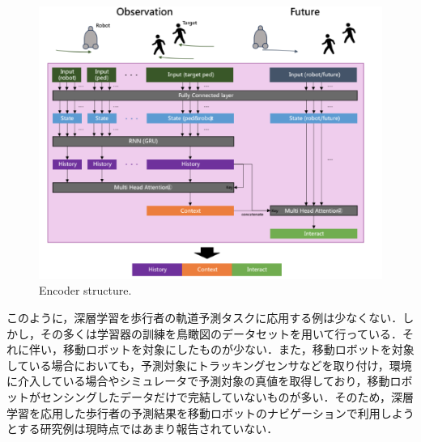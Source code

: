 
\begin{figure}[hbtp]
     \centering
    \includegraphics[keepaspectratio, scale=0.70]
         {images/future-robot.png}
    \caption{Encoder structure.\protect\footnotemark[5]}
    \label{Fig:future-robot}
\end{figure}

\protect{}

このように，深層学習を歩行者の軌道予測タスクに応用する例は少なくない．しかし，その多くは学習器の訓練を鳥瞰図のデータセットを用いて行っている．それに伴い，移動ロボットを対象にしたものが少ない．また，移動ロボットを対象している場合においても，予測対象にトラッキングセンサなどを取り付け，環境に介入している場合やシミュレータで予測対象の真値を取得しており，移動ロボットがセンシングしたデータだけで完結していないものが多い．そのため，深層学習を応用した歩行者の予測結果を移動ロボットのナビゲーションで利用しようとする研究例は現時点ではあまり報告されていない．

\newpage